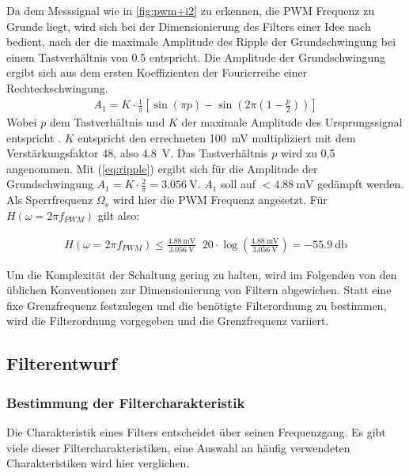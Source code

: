Da dem Messsignal wie in \cref{fig:pwm+i2} zu erkennen, die PWM Frequenz zu Grunde liegt, wird sich bei der Dimensionierung des Filters einer Idee nach \cite{Alter2008} bedient, nach der die maximale Amplitude des Ripple der Grundschwingung bei einem
Tastverhältnis von \num{0,5} ent\-spricht. Die Amplitude der Grundschwingung ergibt sich aus dem ersten Koeffizienten der Fourierreihe einer Rechteckschwingung.
\begin{align}
A_1 = K\cdot \frac{1}{\pi}[\sin(\pi p)-\sin(2\pi(1-\frac{p}{2}))]
\label{eq:ripple}
\end{align}
Wobei $p$ dem Tastverhältnis und $K$ der maximale Amplitude des Ursprungssignal entspricht \cite{Alter2008}. $K$ entspricht den errechneten \SI{100}{\milli\volt} multipliziert mit dem Verstärkungsfaktor 48, also \SI{4,8}{\volt}. 
Das Tastverhältnis $p$ wird zu 0,5
angenommen. Mit (\ref{eq:ripple}) ergibt sich für die Amplitude der Grundschwingung $ A_1 = K\cdot \frac{2}{\pi} = \SI{3,056}{\volt}$. $A_1$ soll auf $ < \SI{4,88}{\milli\volt}$ gedämpft werden.
Als Sperrfrequenz $\Omega_s $ wird hier die PWM Frequenz angesetzt. Für $H(\omega=2\pi f_{PWM})$ gilt also:

\begin{align}
H(\omega=2\pi f_{PWM}) \le \frac{\SI{4,88}{\milli\volt}}{\SI{3,056}{\volt}} \mathop{\hat{=}} 20\cdot\log(\frac{\SI{4,88}{\milli\volt}}{\SI{3,056}{\volt}})= \SI{-55,9}{\decibel}
\label{eq:daempfung}
\end{align}

Um die Komplexität der Schaltung gering zu halten, wird im Folgenden von den üblichen Konventionen zur Dimensionierung von Filtern abgewichen.
Statt eine fixe Grenzfrequenz festzulegen und die benötigte Filterordnung zu bestimmen, wird die Filterordnung vorgegeben und die Grenzfrequenz variiert.

\subsection{Filterentwurf}

\subsubsection{Bestimmung der Filtercharakteristik}

Die Charakteristik eines Filters entscheidet über seinen Frequenzgang. Es gibt viele dieser Filtercharakteristiken, eine Auswahl an häufig verwendeten Charakteristiken wird hier verglichen.

